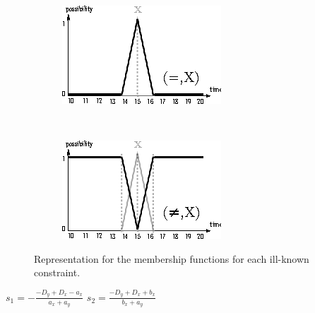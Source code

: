 \documentclass{llncs}
\begin{document}
\begin{figure}
\begin{subfigure}[b]{0.3\textwidth}
  \centering
  \includegraphics[width=\textwidth]{graphs/eq.eps}
\end{subfigure}
~
\begin{subfigure}[b]{0.3\textwidth}
  \centering
  \includegraphics[width=\textwidth]{graphs/neq.eps}
\end{subfigure}
\caption{Representation for the membership functions for each ill-known constraint.}
\end{figure}


 \label{def:intersects_lt}
\begin{algorithm}
\SetAlgoLined
$s_1 = -\frac{-D_y+D_x-a_x}{a_x+a_y}$\;
$s_2 = \frac{-D_y+D_x+b_x}{b_x+a_y}$\;

\end{algorithm}
\end{document}
